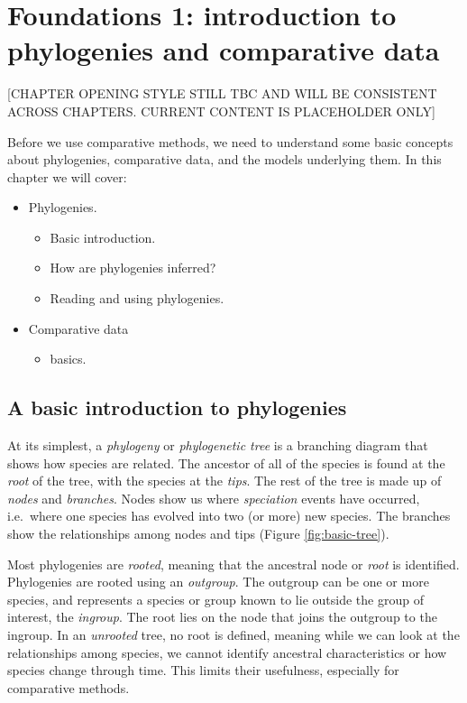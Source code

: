 \documentclass[]{book}
\providecommand{\tightlist}{%
  \setlength{\itemsep}{0pt}\setlength{\parskip}{0pt}}
\begin{document}
\chapter{Foundations 1: introduction to phylogenies and comparative
data}\label{foundations}

{[}CHAPTER OPENING STYLE STILL TBC AND WILL BE CONSISTENT ACROSS
CHAPTERS. CURRENT CONTENT IS PLACEHOLDER ONLY{]}

Before we use comparative methods, we need to understand some basic
concepts about phylogenies, comparative data, and the models underlying
them. In this chapter we will cover:

\begin{itemize}
\tightlist
\item
  Phylogenies.

  \begin{itemize}
  \tightlist
  \item
    Basic introduction.
  \item
    How are phylogenies inferred?
  \item
    Reading and using phylogenies.
  \end{itemize}
\item
  Comparative data

  \begin{itemize}
  \tightlist
  \item
    basics.
  \end{itemize}
\end{itemize}

\section{A basic introduction to
phylogenies}\label{a-basic-introduction-to-phylogenies}

At its simplest, a \emph{phylogeny} or \emph{phylogenetic tree} is a
branching diagram that shows how species are related. The ancestor of
all of the species is found at the \emph{root} of the tree, with the
species at the \emph{tips}. The rest of the tree is made up of
\emph{nodes} and \emph{branches}. Nodes show us where \emph{speciation}
events have occurred, i.e.~where one species has evolved into two (or
more) new species. The branches show the relationships among nodes and
tips (Figure \ref{fig:basic-tree}).

Most phylogenies are \emph{rooted}, meaning that the ancestral node or
\emph{root} is identified. Phylogenies are rooted using an
\emph{outgroup}. The outgroup can be one or more species, and represents
a species or group known to lie outside the group of interest, the
\emph{ingroup}. The root lies on the node that joins the outgroup to the
ingroup. In an \emph{unrooted} tree, no root is defined, meaning while
we can look at the relationships among species, we cannot identify
ancestral characteristics or how species change through time. This
limits their usefulness, especially for comparative methods.
\end{document}
